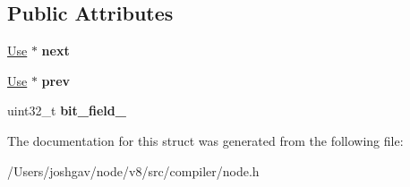 \subsection*{Public Attributes}
\begin{DoxyCompactItemize}
\item 
\hyperlink{structv8_1_1internal_1_1compiler_1_1_node_1_1_use}{Use} $\ast$ {\bfseries next}\hypertarget{structv8_1_1internal_1_1compiler_1_1_node_1_1_use_a53ab0f502f25277287e2821a3583b331}{}\label{structv8_1_1internal_1_1compiler_1_1_node_1_1_use_a53ab0f502f25277287e2821a3583b331}

\item 
\hyperlink{structv8_1_1internal_1_1compiler_1_1_node_1_1_use}{Use} $\ast$ {\bfseries prev}\hypertarget{structv8_1_1internal_1_1compiler_1_1_node_1_1_use_ae813f5f32b98072c46b9a72e497e2278}{}\label{structv8_1_1internal_1_1compiler_1_1_node_1_1_use_ae813f5f32b98072c46b9a72e497e2278}

\item 
uint32\+\_\+t {\bfseries bit\+\_\+field\+\_\+}\hypertarget{structv8_1_1internal_1_1compiler_1_1_node_1_1_use_a50825cac51236be5f38972ffd053370b}{}\label{structv8_1_1internal_1_1compiler_1_1_node_1_1_use_a50825cac51236be5f38972ffd053370b}

\end{DoxyCompactItemize}


The documentation for this struct was generated from the following file\+:\begin{DoxyCompactItemize}
\item 
/\+Users/joshgav/node/v8/src/compiler/node.\+h\end{DoxyCompactItemize}
